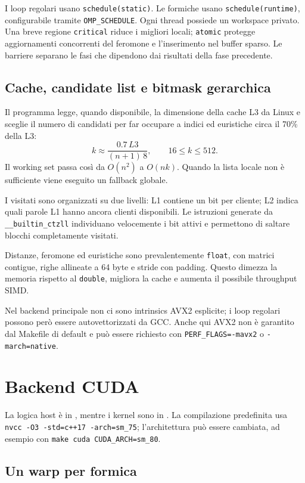 \documentclass[11pt,a4paper]{article}
\begin{document}
I loop regolari usano \texttt{schedule(static)}. Le formiche usano
\texttt{schedule(runtime)}, configurabile tramite \texttt{OMP\_SCHEDULE}. Ogni
thread possiede un workspace privato. Una breve regione \texttt{critical}
riduce i migliori locali; \texttt{atomic} protegge aggiornamenti concorrenti del
feromone e l'inserimento nel buffer sparso. Le barriere separano le fasi che
dipendono dai risultati della fase precedente.

\subsection{Cache, candidate list e bitmask gerarchica}

Il programma legge, quando disponibile, la dimensione della cache L3 da Linux e
sceglie il numero di candidati per far occupare a indici ed euristiche circa il
70\% della L3:
\[
  k\approx\frac{0.7\,L3}{(n+1)\,8},\qquad16\leq k\leq512.
\]
Il working set passa così da $O(n^2)$ a $O(nk)$. Quando la lista locale non è
sufficiente viene eseguito un fallback globale.

I visitati sono organizzati su due livelli: L1 contiene un bit per cliente; L2
indica quali parole L1 hanno ancora clienti disponibili. Le istruzioni generate
da \texttt{\_\_builtin\_ctzll} individuano velocemente i bit attivi e permettono
di saltare blocchi completamente visitati.

Distanze, feromone ed euristiche sono prevalentemente \texttt{float}, con
matrici contigue, righe allineate a 64 byte e stride con padding. Questo dimezza
la memoria rispetto al \texttt{double}, migliora la cache e aumenta il possibile
throughput SIMD.

Nel backend principale non ci sono intrinsics AVX2 esplicite; i loop regolari
possono però essere autovettorizzati da GCC. Anche qui AVX2 non è garantito dal
Makefile di default e può essere richiesto con \texttt{PERF\_FLAGS=-mavx2} o
\texttt{-march=native}.

\section{Backend CUDA}

La logica host è in , mentre i kernel sono in
. La compilazione predefinita usa
\texttt{nvcc -O3 -std=c++17 -arch=sm\_75}; l'architettura può essere cambiata,
ad esempio con \texttt{make cuda CUDA\_ARCH=sm\_80}.

\subsection{Un warp per formica}
\end{document}
